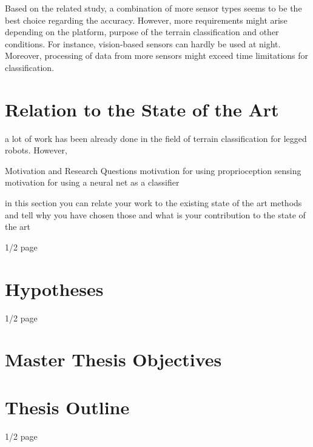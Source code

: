 Based on the related study, a combination of more sensor types seems to be the best choice regarding the accuracy. However, more requirements might arise depending on the platform, purpose of the terrain classification and other conditions. For instance, vision-based sensors can hardly be used at night. Moreover, processing of data from more sensors might exceed time limitations for classification.

\section{Relation to the State of the Art}
a lot of work has been already done in the field of terrain classification for legged robots. However, 

Motivation and Research Questions
motivation for using proprioception sensing
motivation for using a neural net as a classifier

in this section you can relate your work to the existing state of the art methods and tell why you have chosen those and what is your contribution to the state of the art

1/2 page

\section{Hypotheses}

1/2 page

\newpage
\section{Master Thesis Objectives} \label{sec:goals}

\section{Thesis Outline}

1/2 page

